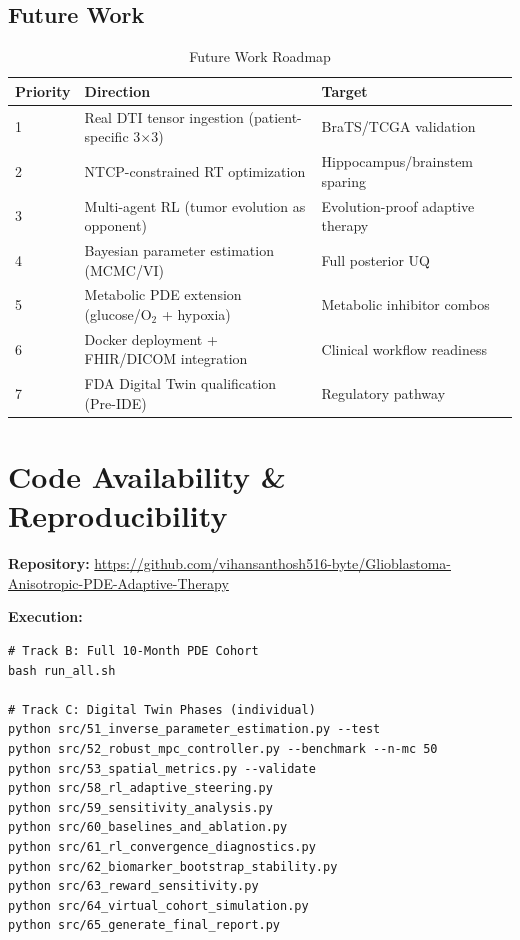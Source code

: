 \documentclass[11pt, twocolumn]{article}
\begin{document}
\subsection{Future Work}
\begin{table}[h]
\centering
\caption{Future Work Roadmap}
\begin{tabular}{lll}
\toprule
Priority & Direction & Target \\
\midrule
1 & Real DTI tensor ingestion (patient-specific 3$\times$3) & BraTS/TCGA validation \\
2 & NTCP-constrained RT optimization & Hippocampus/brainstem sparing \\
3 & Multi-agent RL (tumor evolution as opponent) & Evolution-proof adaptive therapy \\
4 & Bayesian parameter estimation (MCMC/VI) & Full posterior UQ \\
5 & Metabolic PDE extension (glucose/O$_2$ + hypoxia) & Metabolic inhibitor combos \\
6 & Docker deployment + FHIR/DICOM integration & Clinical workflow readiness \\
7 & FDA Digital Twin qualification (Pre-IDE) & Regulatory pathway \\
\bottomrule
\end{tabular}
\end{table}

\section{Code Availability \& Reproducibility}

\textbf{Repository:} \url{https://github.com/vihansanthosh516-byte/Glioblastoma-Anisotropic-PDE-Adaptive-Therapy}

\textbf{Execution:}
\begin{verbatim}
# Track B: Full 10-Month PDE Cohort
bash run_all.sh

# Track C: Digital Twin Phases (individual)
python src/51_inverse_parameter_estimation.py --test
python src/52_robust_mpc_controller.py --benchmark --n-mc 50
python src/53_spatial_metrics.py --validate
python src/58_rl_adaptive_steering.py
python src/59_sensitivity_analysis.py
python src/60_baselines_and_ablation.py
python src/61_rl_convergence_diagnostics.py
python src/62_biomarker_bootstrap_stability.py
python src/63_reward_sensitivity.py
python src/64_virtual_cohort_simulation.py
python src/65_generate_final_report.py
\end{verbatim}
\end{document}
